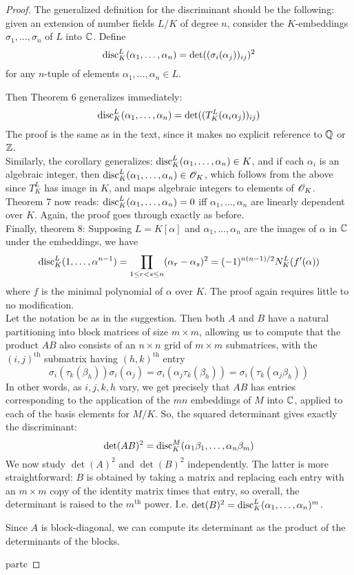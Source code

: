 \begin{proof}
	The generalized definition for the discriminant should be the following: given an extension of number fields $L/K$ of degree $n$, consider the $K$-embeddings $\sigma_1,\ldots,\sigma_n$ of $L$ into $\mathbb{C}$. Define
	\[ \operatorname{disc}^L_K(\alpha_1,\ldots,\alpha_n) = \det((\sigma_i(\alpha_j))_{ij})^2 \]
	for any $n$-tuple of elements $\alpha_1,\ldots,\alpha_n \in L$.
	
	Then Theorem 6 generalizes immediately:
	\[ \operatorname{disc}^L_K(\alpha_1,\ldots,\alpha_n) = \det((T^L_K(\alpha_i\alpha_j))_{ij}) \]
	The proof is the same as in the text, since it makes no explicit reference to $\mathbb{Q}$ or $\mathbb{Z}$. \\
	
	Similarly, the corollary generalizes: $\operatorname{disc}^L_K(\alpha_1,\ldots,\alpha_n) \in K$, and if each $\alpha_i$ is an algebraic integer, then $\operatorname{disc}^L_K(\alpha_1,\ldots,\alpha_n) \in \mathscr{O}_K$, which follows from the above since $T^L_K$ has image in $K$, and maps algebraic integers to elements of $\mathscr{O}_K$. \\
	
	Theorem 7 now reads: $\operatorname{disc}^L_K(\alpha_1,\ldots,\alpha_n) = 0$ iff $\alpha_1,\ldots,\alpha_n$ are linearly dependent over $K$. Again, the proof goes through exactly as before. \\
	
	Finally, theorem 8: Supposing $L = K[\alpha]$ and $\alpha_1,\ldots,\alpha_n$ are the images of $\alpha$ in $\mathbb{C}$ under the embeddings, we have
	\[ \operatorname{disc}^L_K(1,\ldots,\alpha^{n-1}) = \prod_{1 \leq r < s \leq n} (\alpha_r-\alpha_s)^2 = (-1)^{n(n-1)/2}N^L_K(f'(\alpha)) \]
	where $f$ is the minimal polynomial of $\alpha$ over $K$. The proof again requires little to no modification. \\
	
	Let the notation be as in the suggestion. Then both $A$ and $B$ have a natural partitioning into block matrices of size $m \times m$, allowing us to compute that the product $AB$ also consists of an $n \times n$ grid of $m \times m$ submatrices, with the $(i,j)^\text{th}$ submatrix having $(h,k)^\text{th}$ entry
	\[ \sigma_i(\tau_k(\beta_h))\sigma_i(\alpha_j) = \sigma_i(\alpha_j\tau_k(\beta_h)) = \sigma_i(\tau_k(\alpha_j\beta_h)) \]
	In other words, as $i,j,k,h$ vary, we get precisely that $AB$ has entries corresponding to the application of the $mn$ embeddings of $M$ into $\mathbb{C}$, applied to each of the basis elements for $M/K$. So, the squared determinant gives exactly the discriminant:
	\[ \det(AB)^2 = \operatorname{disc}_K^M(\alpha_1\beta_1,\ldots,\alpha_n\beta_m) \]
	We now study $\det(A)^2$ and $\det(B)^2$ independently. The latter is more straightforward: $B$ is obtained by taking a matrix and replacing each entry with an $m \times m$ copy of the identity matrix times that entry, so overall, the determinant is raised to the $m^\text{th}$ power. I.e. $\det(B)^2 = \operatorname{disc}_K^L(\alpha_1,\ldots,\alpha_n)^m$.
	
	Since $A$ is block-diagonal, we can compute its determinant as the product of the determinants of the blocks. 
	
	partc
\end{proof}
